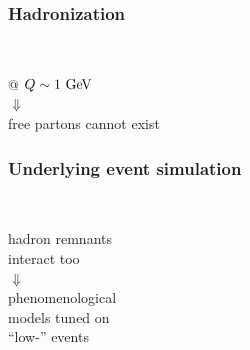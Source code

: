 \begin{frame}\frametitle{Hadronization}
\centering\myskip


\vspace{.5\paperheight}

\begin{minipage}{.6\textwidth}\centering
$\quad$
\end{minipage}\begin{minipage}{.4\textwidth}\centering
@ $Q\sim 1\gev$\\
{\LARGE $\Downarrow$}\\
free partons cannot exist
\end{minipage}

\end{frame}


\begin{frame}\frametitle{Underlying event simulation}
\centering


\begin{minipage}{.65\textwidth}\centering
$\quad$
\end{minipage}\begin{minipage}{.35\textwidth}\centering\myskip
hadron remnants\\ interact too\\
{\LARGE $\Downarrow$}\\
phenomenological\\ models tuned on\\
``low-\pt'' events
\end{minipage}

\vspace{.5\paperheight}


\end{frame}


